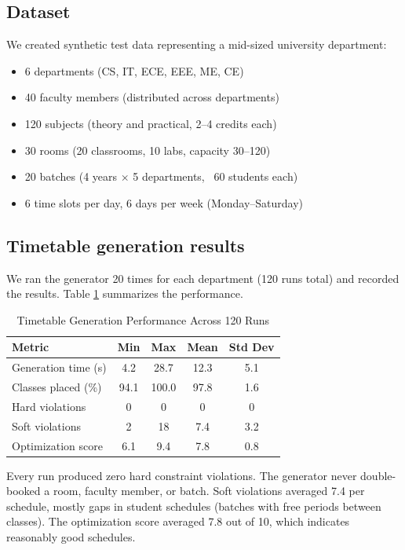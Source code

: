 \documentclass[conference]{IEEEtran}
\begin{document}
\subsection{Dataset}

We created synthetic test data representing a mid-sized university department:

\begin{itemize}
\item 6 departments (CS, IT, ECE, EEE, ME, CE)
\item 40 faculty members (distributed across departments)
\item 120 subjects (theory and practical, 2--4 credits each)
\item 30 rooms (20 classrooms, 10 labs, capacity 30--120)
\item 20 batches (4 years $\times$ 5 departments, ~60 students each)
\item 6 time slots per day, 6 days per week (Monday--Saturday)
\end{itemize}

\subsection{Timetable generation results}

We ran the generator 20 times for each department (120 runs total) and recorded the results. Table \ref{tab:generation} summarizes the performance.

\begin{table}[htbp]
\caption{Timetable Generation Performance Across 120 Runs}
\label{tab:generation}
\centering
\begin{tabular}{@{}lcccc@{}}
\toprule
\textbf{Metric} & \textbf{Min} & \textbf{Max} & \textbf{Mean} & \textbf{Std Dev} \\
\midrule
Generation time (s) & 4.2 & 28.7 & 12.3 & 5.1 \\
Classes placed (\%) & 94.1 & 100.0 & 97.8 & 1.6 \\
Hard violations & 0 & 0 & 0 & 0 \\
Soft violations & 2 & 18 & 7.4 & 3.2 \\
Optimization score & 6.1 & 9.4 & 7.8 & 0.8 \\
\bottomrule
\end{tabular}
\end{table}

Every run produced zero hard constraint violations. The generator never double-booked a room, faculty member, or batch. Soft violations averaged 7.4 per schedule, mostly gaps in student schedules (batches with free periods between classes). The optimization score averaged 7.8 out of 10, which indicates reasonably good schedules.
\end{document}
